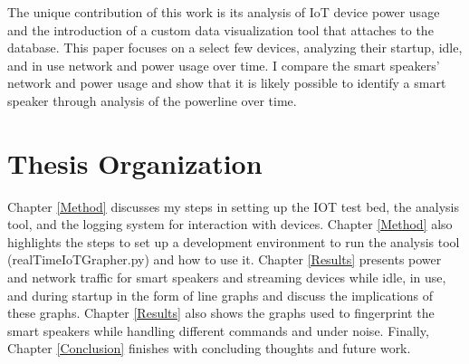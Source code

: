 The unique contribution of this work is its analysis of IoT device power usage and the introduction of a custom data visualization tool that attaches to the database. This paper focuses on a select few devices, analyzing their startup, idle, and in use network and power usage over time. I compare the smart speakers' network and power usage and show that it is likely possible to identify a smart speaker through analysis of the powerline over time.

\section{Thesis Organization}
Chapter \ref{Method} discusses my steps in setting up the IOT test bed, the analysis tool, and the logging system for interaction with devices. Chapter \ref{Method} also highlights the steps to set up a development environment to run the analysis tool (realTimeIoTGrapher.py) and how to use it. Chapter \ref{Results} presents power and network traffic for smart speakers and streaming devices while idle, in use, and during startup in the form of line graphs and discuss the implications of these graphs. Chapter \ref{Results} also shows the graphs used to fingerprint the smart speakers while handling different commands and under noise. Finally, Chapter \ref{Conclusion} finishes with concluding thoughts and future work.

